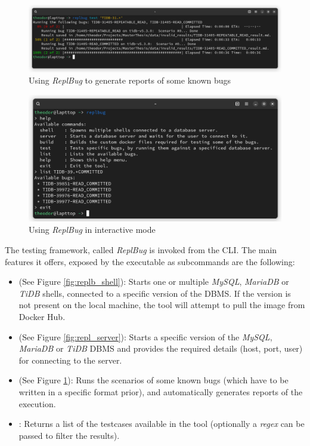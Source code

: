 \begin{figure}
    \centering
    \includegraphics[width=\linewidth]{assets/replbug_test.png}
    \caption{Using \textit{ReplBug} to generate reports of some known bugs}
    \label{fig:repl_test}
\end{figure}


\begin{figure}
    \centering
    \includegraphics[width=\linewidth]{assets/replbug_interactive.png}
    \caption{Using \textit{ReplBug} in interactive mode}
    \label{fig:repl_interactive}
\end{figure}




The testing framework, called \textit{ReplBug} is invoked from the CLI. The main features it offers, exposed by the executable as subcommands are the following:
\begin{itemize}
    \item \textbf{} (See Figure \ref{fig:replb_shell}): Starts one or multiple \textit{MySQL}, \textit{MariaDB} or \textit{TiDB} shells, connected to a specific version of the DBMS. If the version is not present on the local machine, the tool will attempt to pull the image from Docker Hub.
    \item \textbf{} (See Figure \ref{fig:repl_server}): Starts a specific version of the \textit{MySQL}, \textit{MariaDB} or \textit{TiDB} DBMS and provides the required details (host, port, user) for connecting to the server.
    \item \textbf{} (See Figure \ref{fig:repl_test}): Runs the scenarios of some known bugs (which have to be written in a specific format prior), and automatically generates reports of the execution.
    \item \textbf{}: Returns a list of the testcases available in the tool (optionally a \textit{regex} can be passed to filter the results).
\end{itemize}

